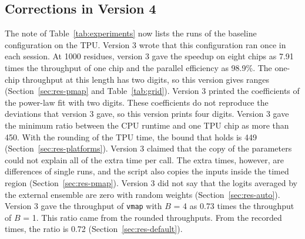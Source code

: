 \subsection*{Corrections in Version 4}
The note of Table~\ref{tab:experiments} now lists the runs of the baseline configuration on the TPU. Version 3 wrote that
this configuration ran once in each session.
At 1000 residues, version 3 gave the speedup on eight chips as 7.91 times the throughput of one chip and the parallel efficiency as 98.9\%. %
The one-chip throughput at this length has two digits, so this version gives ranges (Section~\ref{sec:res-pmap} and Table~\ref{tab:grid}).
Version 3 printed the coefficients of the power-law fit with two digits. These coefficients do not reproduce the
deviations that version 3 gave, so this version prints four digits.
Version 3 gave the minimum ratio between the CPU runtime and one TPU chip as more than 450. %
With the rounding of the TPU time, the bound that holds is 449 (Section~\ref{sec:res-platforms}). %
Version 3 claimed that the copy of the parameters could not explain all of the extra time per call.
The extra times, however, are differences of single runs, and the script also copies the inputs inside the timed region (Section~\ref{sec:res-pmap}).
Version 3 did not say that the logits averaged by the external ensemble are zero with
random weights (Section~\ref{sec:res-auto}).
Version 3 gave the throughput of \texttt{vmap} with $B$ = 4 as 0.73 times the throughput of $B$ = 1. %
This ratio came from the rounded throughputs. From the recorded times, the ratio is 0.72 (Section~\ref{sec:res-default}). %


